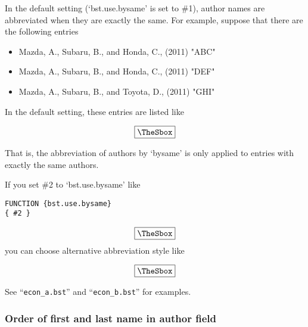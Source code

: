 \documentclass[10pt]{article}
\newenvironment{Frame}%
{\setlength{\fboxsep}{15pt}
\setlength{\mylength}{\linewidth}%
\addtolength{\mylength}{-2\fboxsep}%
\addtolength{\mylength}{-2\fboxrule}%
\Sbox
\minipage{\mylength}%
\setlength{\abovedisplayskip}{0pt}%
\setlength{\belowdisplayskip}{0pt}%
}%
{\endminipage\endSbox
\[\fbox{\TheSbox}\]}
\newcommand{\bysameline}{\hskip.3em \leavevmode\rule[.5ex]{3em}{.3pt}\hskip0.5em}
\begin{document}
In the default setting (`bst.use.bysame' is set to \#1), author names
are abbreviated when they are exactly the same. For example, suppose
that there are the following entries
\begin{itemize}
 \item Mazda, A., Subaru, B., and Honda, C., (2011) "ABC"
 \item Mazda, A., Subaru, B., and Honda, C., (2011) "DEF"
 \item Mazda, A., Subaru, B., and Toyota, D., (2011) "GHI"
\end{itemize}
\vspace*{1em}

In the default setting, these entries are listed like
\begin{Frame}
\end{Frame}

That is, the abbreviation of authors by `bysame' is only applied to
entries with exactly the same authors.

If you set \#2 to `bst.use.bysame' like
\begin{Frame}
\begin{verbatim}
FUNCTION {bst.use.bysame}
{ #2 }  
\end{verbatim}
\end{Frame}
you can choose alternative abbreviation style like
\begin{Frame}
\end{Frame}
\vspace*{1em}

See ``\verb|econ_a.bst|'' and ``\verb|econ_b.bst|'' for examples.


\subsubsection{Order of first and last name in author field}
\end{document}
